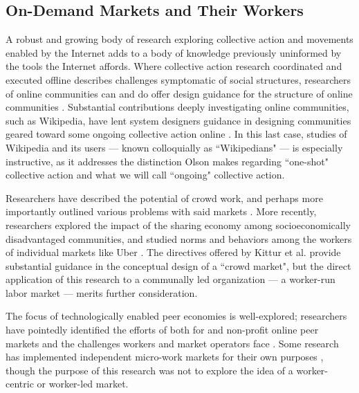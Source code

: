 
\subsection{On-Demand Markets and Their Workers}

A robust and growing body of research exploring collective action and movements enabled by the Internet adds to a body of knowledge previously uninformed by the tools the Internet affords.
Where collective action research coordinated and executed offline describes challenges symptomatic of social structures,
researchers of online communities can and do offer design guidance for the structure of online communities
\cite{Hirsch:2009:FLA:1516016.1516024}.
Substantial contributions deeply investigating online communities, such as Wikipedia, have lent system designers guidance in designing communities geared toward some ongoing collective action online
\cite{Nov:2007:MW:1297797.1297798,wikipediansBornNotMade,whyWikipedians}.
In this last case, studies of Wikipedia and its users
--- known colloquially as ``Wikipedians" ---
is especially instructive, as it addresses the distinction Olson makes regarding ``one-shot" collective action and what we will call ``ongoing" collective action.

Researchers have described the potential of crowd work, and perhaps more importantly outlined various problems with said markets
\cite{crowdworkFuture}.
More recently, researchers explored the impact of the sharing economy among socioeconomically disadvantaged communities,
and studied norms and behaviors among the workers of individual markets like Uber
\cite{DillahuntPromise,uberAlgorithm}.
The directives offered by Kittur et al. provide substantial guidance in the conceptual design of a ``crowd market",
but the direct application of this research to a communally led organization
--- a worker-run labor market --- merits further consideration.


The focus of technologically enabled peer economies is well-explored;
researchers have pointedly identified the efforts of both for and non-profit online peer markets and the challenges workers and market operators face
\cite{uberAlgorithm,Bellotti:2014:TCS:2611247.2557061,Thebault-Spieker:2015:ASS:2675133.2675278}.
Some research has implemented independent micro-work markets for their own purposes
\cite{Alt:2010:LCE:1868914.1868921},
though the purpose of this research was not to explore the idea of a worker-centric or worker-led market.

